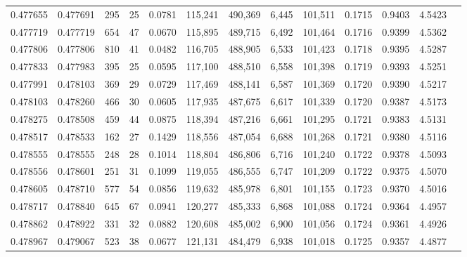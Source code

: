 \begin{tabular}{rrrrrrrrrrrrr}
0.477655 & 0.477691 &   295 &    25 &                                     0.0781 & 115,241 & 490,369 &   6,445 & 101,511 & 0.1715 & 0.9403 & 4.5423 \\
0.477719 & 0.477719 &   654 &    47 &                                     0.0670 & 115,895 & 489,715 &   6,492 & 101,464 & 0.1716 & 0.9399 & 4.5362 \\
0.477806 & 0.477806 &   810 &    41 &                                     0.0482 & 116,705 & 488,905 &   6,533 & 101,423 & 0.1718 & 0.9395 & 4.5287 \\
0.477833 & 0.477983 &   395 &    25 &                                     0.0595 & 117,100 & 488,510 &   6,558 & 101,398 & 0.1719 & 0.9393 & 4.5251 \\
0.477991 & 0.478103 &   369 &    29 &                                     0.0729 & 117,469 & 488,141 &   6,587 & 101,369 & 0.1720 & 0.9390 & 4.5217 \\
0.478103 & 0.478260 &   466 &    30 &                                     0.0605 & 117,935 & 487,675 &   6,617 & 101,339 & 0.1720 & 0.9387 & 4.5173 \\
0.478275 & 0.478508 &   459 &    44 &                                     0.0875 & 118,394 & 487,216 &   6,661 & 101,295 & 0.1721 & 0.9383 & 4.5131 \\
0.478517 & 0.478533 &   162 &    27 &                                     0.1429 & 118,556 & 487,054 &   6,688 & 101,268 & 0.1721 & 0.9380 & 4.5116 \\
0.478555 & 0.478555 &   248 &    28 &                                     0.1014 & 118,804 & 486,806 &   6,716 & 101,240 & 0.1722 & 0.9378 & 4.5093 \\
0.478556 & 0.478601 &   251 &    31 &                                     0.1099 & 119,055 & 486,555 &   6,747 & 101,209 & 0.1722 & 0.9375 & 4.5070 \\
0.478605 & 0.478710 &   577 &    54 &                                     0.0856 & 119,632 & 485,978 &   6,801 & 101,155 & 0.1723 & 0.9370 & 4.5016 \\
0.478717 & 0.478840 &   645 &    67 &                                     0.0941 & 120,277 & 485,333 &   6,868 & 101,088 & 0.1724 & 0.9364 & 4.4957 \\
0.478862 & 0.478922 &   331 &    32 &                                     0.0882 & 120,608 & 485,002 &   6,900 & 101,056 & 0.1724 & 0.9361 & 4.4926 \\
0.478967 & 0.479067 &   523 &    38 &                                     0.0677 & 121,131 & 484,479 &   6,938 & 101,018 & 0.1725 & 0.9357 & 4.4877 \\

\end{tabular}
